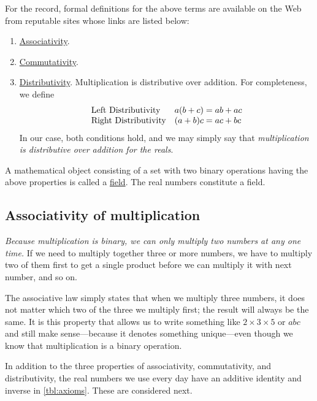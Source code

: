 \documentclass[
  a4paper,
]{article}
\begin{document}
\hfill\break
For the record, formal definitions for the above terms are available on
the Web from reputable sites whose links are listed below:

\begin{enumerate}
\item
  \href{https://mathworld.wolfram.com/Associative.html}{Associativity}.
\item
  \href{https://mathworld.wolfram.com/Commutative.html}{Commutativity}.
\item
  \href{https://en.wikipedia.org/wiki/Distributive_property}{Distributivity}.
  Multiplication is distributive over addition. For completeness, we
  define \[
  \begin{array}{l  l}
  \mbox{Left Distributivity} & a(b+c)=ab+ac\\
  \mbox{Right Distributivity} & (a+b)c=ac+bc\\
  \end{array}
  \] In our case, both conditions hold, and we may simply say that
  \emph{multiplication is distributive over addition for the reals}.
\end{enumerate}

A mathematical object consisting of a set with two binary operations
having the above properties is called a
\href{https://en.wikipedia.org/wiki/Field_(mathematics)}{field}. The
real numbers constitute a field.

\hypertarget{associativity-of-multiplication}{%
\subsection{Associativity of
multiplication}\label{associativity-of-multiplication}}

\emph{Because multiplication is binary, we can only multiply two numbers
at any one time.} If we need to multiply together three or more numbers,
we have to multiply two of them first to get a single product before we
can multiply it with next number, and so on.

The associative law simply states that when we multiply three numbers,
it does not matter which two of the three we multiply first; the result
will always be the same. It is this property that allows us to write
something like \(2 \times 3 \times 5\) or \(abc\) and still make
sense---because it denotes something unique---even though we know that
multiplication is a binary operation.

In addition to the three properties of associativity, commutativity, and
distributivity, the real numbers we use every day have an additive
identity and inverse in \cref{tbl:axioms}. These are considered next.
\end{document}
